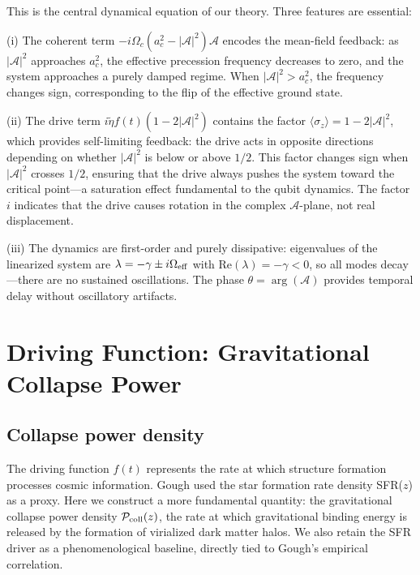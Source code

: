 \documentclass[aps,prd,twocolumn,superscriptaddress]{revtex4-2}
\begin{document}
This is the central dynamical equation of our theory. Three features are essential:

(i) The coherent term $-i\Omega_c(a_c^2 - |\mathcal{A}|^2)\mathcal{A}$ encodes the mean-field feedback: as $|\mathcal{A}|^2$ approaches $a_c^2$, the effective precession frequency decreases to zero, and the system approaches a purely damped regime. When $|\mathcal{A}|^2 > a_c^2$, the frequency changes sign, corresponding to the flip of the effective ground state.

(ii) The drive term $i\tilde{\eta}f(t)(1-2|\mathcal{A}|^2)$ contains the factor $\langle\sigma_z\rangle = 1-2|\mathcal{A}|^2$, which provides self-limiting feedback: the drive acts in opposite directions depending on whether $|\mathcal{A}|^2$ is below or above $1/2$. This factor changes sign when $|\mathcal{A}|^2$ crosses $1/2$, ensuring that the drive always pushes the system toward the critical point---a saturation effect fundamental to the qubit dynamics. The factor $i$ indicates that the drive causes rotation in the complex $\mathcal{A}$-plane, not real displacement.

(iii) The dynamics are first-order and purely dissipative: eigenvalues of the linearized system are $\lambda = -\gamma \pm i\Omega_{\rm eff}$ with $\mathrm{Re}(\lambda) = -\gamma < 0$, so all modes decay---there are no sustained oscillations. The phase $\theta = \arg(\mathcal{A})$ provides temporal delay without oscillatory artifacts.

\section{Driving Function: Gravitational Collapse Power}
\label{sec:driver}

\subsection{Collapse power density}

The driving function $f(t)$ represents the rate at which structure formation processes cosmic information. Gough \cite{Gough:2025} used the star formation rate density SFR($z$) as a proxy. Here we construct a more fundamental quantity: the gravitational collapse power density $\mathcal{P}_{\rm coll}(z)$, the rate at which gravitational binding energy is released by the formation of virialized dark matter halos. We also retain the SFR driver as a phenomenological baseline, directly tied to Gough's empirical correlation.
\end{document}
